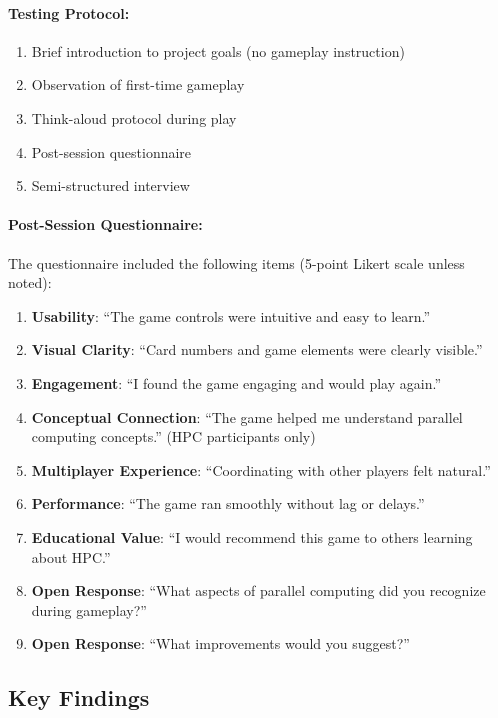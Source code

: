 \paragraph*{Testing Protocol:}
\begin{enumerate}
    \item Brief introduction to project goals (no gameplay instruction)
    \item Observation of first-time gameplay
    \item Think-aloud protocol during play
    \item Post-session questionnaire
    \item Semi-structured interview
\end{enumerate}

\paragraph*{Post-Session Questionnaire:}
The questionnaire included the following items (5-point Likert scale unless noted):
\begin{enumerate}
    \item \textbf{Usability}: ``The game controls were intuitive and easy to learn.''
    \item \textbf{Visual Clarity}: ``Card numbers and game elements were clearly visible.''
    \item \textbf{Engagement}: ``I found the game engaging and would play again.''
    \item \textbf{Conceptual Connection}: ``The game helped me understand parallel computing concepts.'' (HPC participants only)
    \item \textbf{Multiplayer Experience}: ``Coordinating with other players felt natural.''
    \item \textbf{Performance}: ``The game ran smoothly without lag or delays.''
    \item \textbf{Educational Value}: ``I would recommend this game to others learning about HPC.''
    \item \textbf{Open Response}: ``What aspects of parallel computing did you recognize during gameplay?''
    \item \textbf{Open Response}: ``What improvements would you suggest?''
\end{enumerate}

\subsection{Key Findings}
\label{subsec:usability-findings}

